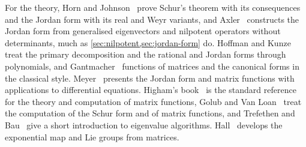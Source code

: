 For the theory, Horn and Johnson~\cite[Chaps.~2 and~3]{horn2013} prove Schur's theorem with its consequences and the Jordan form with its real and Weyr variants, and Axler~\cite[Chap.~8]{axler2024} constructs the Jordan form from generalised eigenvectors and nilpotent operators without determinants, much as \cref{sec:nilpotent,sec:jordan-form} do. Hoffman and Kunze~\cite[Chaps.~6 and~7]{hoffman1971} treat the primary decomposition and the rational and Jordan forms through polynomials, and Gantmacher~\cite[Chaps.~V--VII]{gantmacher1959} functions of matrices and the canonical forms in the classical style. Meyer~\cite[Chap.~7]{meyer2000} presents the Jordan form and matrix functions with applications to differential equations. Higham's book~\cite{higham2008} is the standard reference for the theory and computation of matrix functions, Golub and Van Loan~\cite[Chaps.~7 and~9]{golub2013} treat the computation of the Schur form and of matrix functions, and Trefethen and Bau~\cite[Lectures~24--29]{trefethen1997} give a short introduction to eigenvalue algorithms. Hall~\cite{hall2015} develops the exponential map and Lie groups from matrices.

\chapterreferences
